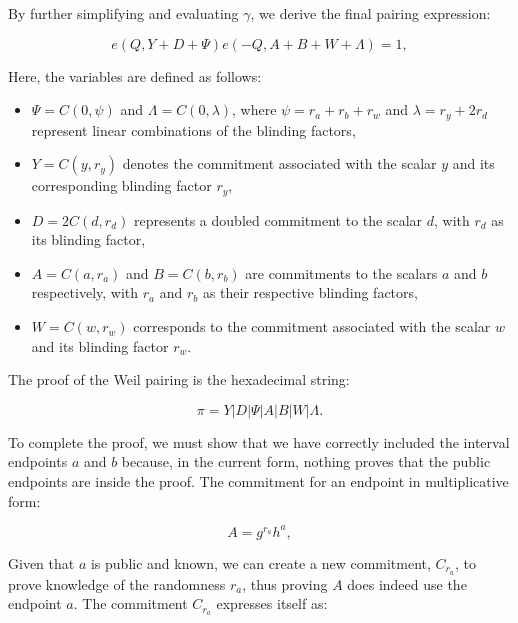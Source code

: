 \documentclass[version=preprint]{iacrcc}
\begin{document}
By further simplifying and evaluating \( \gamma \), we derive the final pairing expression:

\begin{equation}
e(Q, Y + D + \Psi)e(-Q, A + B + W + \Lambda) = 1,
\end{equation}

Here, the variables are defined as follows:

\begin{itemize}
    \item \( \Psi = C(0, \psi) \) and \( \Lambda = C(0, \lambda) \), where \( \psi = r_{a} + r_{b} + r_{w} \) and \( \lambda = r_{y} + 2r_{d} \) represent linear combinations of the blinding factors,
    \item \( Y = C(y, r_{y}) \) denotes the commitment associated with the scalar \( y \) and its corresponding blinding factor \( r_{y} \),
    \item \( D = 2C(d, r_{d}) \) represents a doubled commitment to the scalar \( d \), with \( r_{d} \) as its blinding factor,
    \item \( A = C(a, r_{a}) \) and \( B = C(b, r_{b}) \) are commitments to the scalars \( a \) and \( b \) respectively, with \( r_{a} \) and \( r_{b} \) as their respective blinding factors,
    \item \( W = C(w, r_{w}) \) corresponds to the commitment associated with the scalar \( w \) and its blinding factor \( r_{w} \).
\end{itemize}

The proof of the Weil pairing is the hexadecimal string:

\begin{equation}
\pi = Y | D | \Psi | A | B | W | \Lambda.
\end{equation}

To complete the proof, we must show that we have correctly included the interval endpoints \( a \) and \( b \) because, in the current form, nothing proves that the public endpoints are inside the proof. The commitment for an endpoint in multiplicative form:

\begin{equation}
A = g^{r_{a}} h^{a},
\end{equation}

Given that \( a \) is public and known, we can create a new commitment, \( C_{r_a} \), to prove knowledge of the randomness \( r_a \), thus proving $A$ does indeed use the endpoint \(a\). The commitment \( C_{r_a} \) expresses itself as:
\end{document}
